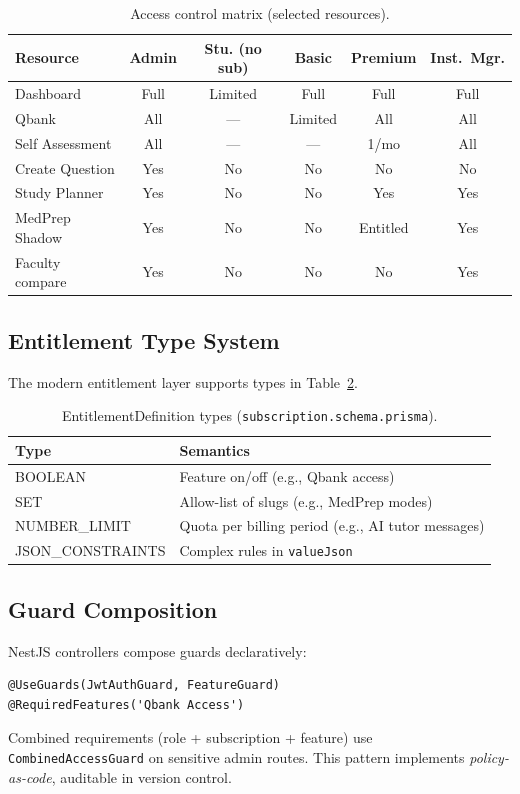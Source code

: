 \begin{table}[htbp]
  \centering
  \caption{Access control matrix (selected resources).}
  \label{tab:access-matrix}
  \footnotesize
  \begin{tabular}{@{}lccccc@{}}
    \toprule
    \textbf{Resource} & \textbf{Admin} & \textbf{Stu. (no sub)} & \textbf{Basic} & \textbf{Premium} & \textbf{Inst.\ Mgr.} \\
    \midrule
    Dashboard & Full & Limited & Full & Full & Full \\
    Qbank & All & --- & Limited & All & All \\
    Self Assessment & All & --- & --- & 1/mo & All \\
    Create Question & Yes & No & No & No & No \\
    Study Planner & Yes & No & No & Yes & Yes \\
    MedPrep Shadow & Yes & No & No & Entitled & Yes \\
    Faculty compare & Yes & No & No & No & Yes \\
    \bottomrule
  \end{tabular}
\end{table}

\subsection{Entitlement Type System}
The modern entitlement layer supports types in Table~\ref{tab:entitlement-types}.

\begin{table}[htbp]
  \centering
  \caption{EntitlementDefinition types (\texttt{subscription.schema.prisma}).}
  \label{tab:entitlement-types}
  \begin{tabular}{@{}lp{9.8cm}@{}}
    \toprule
    \textbf{Type} & \textbf{Semantics} \\
    \midrule
    BOOLEAN & Feature on/off (e.g., Qbank access) \\
    SET & Allow-list of slugs (e.g., MedPrep modes) \\
    NUMBER\_LIMIT & Quota per billing period (e.g., AI tutor messages) \\
    JSON\_CONSTRAINTS & Complex rules in \texttt{valueJson} \\
    \bottomrule
  \end{tabular}
\end{table}

\subsection{Guard Composition}
NestJS controllers compose guards declaratively:
\begin{verbatim}
@UseGuards(JwtAuthGuard, FeatureGuard)
@RequiredFeatures('Qbank Access')
\end{verbatim}
Combined requirements (role + subscription + feature) use \texttt{CombinedAccessGuard} on sensitive admin routes. This pattern implements \emph{policy-as-code}, auditable in version control.

